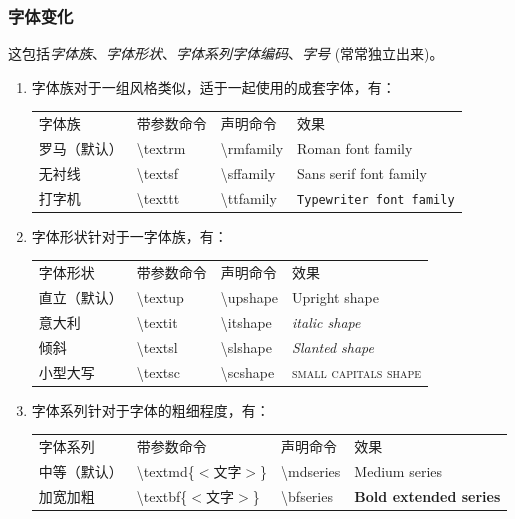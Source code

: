 \documentclass[UTF8]{ctexart}
\begin{document}
        \subsubsection{字体变化}

            这包括\emph{字体族}、\emph{字体形状}、\emph{字体系列}\emph{字体编码}、\emph{字号} (常常独立出来)。

            \begin{enumerate}
                \item 字体族对于一组风格类似，适于一起使用的成套字体，有：

                \begin{tabular}{llll}
                    字体族 & 带参数命令 & 声明命令 & 效果 \\
                    罗马（默认） & \textbackslash textrm & \textbackslash rmfamily & \textrm{Roman font family} \\
                    无衬线 & \textbackslash textsf & \textbackslash sffamily & \textsf{Sans serif font family} \\
                    打字机 & \textbackslash texttt & \textbackslash ttfamily & \texttt{Typewriter font family} \\
                \end{tabular}

                \item 字体形状针对于一字体族，有：

                \begin{tabular}{llll}
                    字体形状 & 带参数命令 & 声明命令 & 效果 \\
                    直立（默认）& \textbackslash textup & \textbackslash upshape & \textup{Upright shape} \\
                    意大利 & \textbackslash textit & \textbackslash itshape & \textit{italic shape} \\
                    倾斜 & \textbackslash textsl & \textbackslash slshape & \textsl{Slanted shape} \\
                    小型大写 & \textbackslash textsc & \textbackslash scshape & \textsc{small capitals shape} \\
                \end{tabular}

                \item 字体系列针对于字体的粗细程度，有：

                \begin{tabular}{llll}
                    字体系列 & 带参数命令 & 声明命令 & 效果 \\
                    中等（默认） & \textbackslash textmd\{$<$文字$>$\} & \textbackslash mdseries & \textmd{Medium series} \\
                    加宽加粗 & \textbackslash textbf\{$<$文字$>$\} & \textbackslash bfseries & \textbf{Bold extended series} \\
                \end{tabular}

            \end{enumerate}
\end{document}
